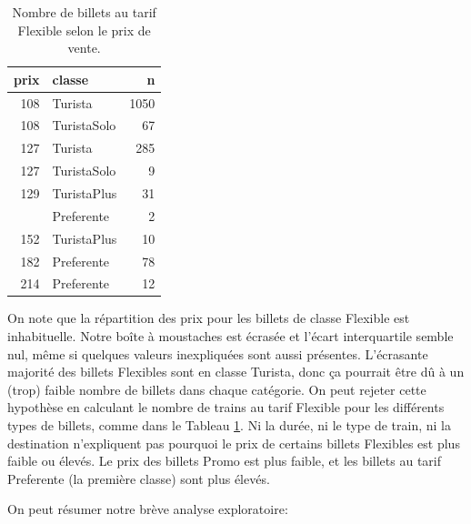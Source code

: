 \documentclass[
  11pt,
  letterpaper,
]{book}
\theoremstyle{definition}
\theoremstyle{definition}
\theoremstyle{definition}
\theoremstyle{definition}
\theoremstyle{remark}
\begin{document}
\begin{table}

\caption{\label{tab:renfeaedrep}Nombre de billets au tarif Flexible selon le prix de vente.}
\centering
\begin{tabular}[t]{rlr}
\toprule
prix & classe & n\\
\midrule
108 & Turista & 1050\\
108 & TuristaSolo & 67\\
127 & Turista & 285\\
127 & TuristaSolo & 9\\
129 & TuristaPlus & 31\\
\addlinespace
140 & Preferente & 2\\
152 & TuristaPlus & 10\\
182 & Preferente & 78\\
214 & Preferente & 12\\
\bottomrule
\end{tabular}
\end{table}

On note que la répartition des prix pour les billets de classe Flexible est inhabituelle. Notre boîte à moustaches est écrasée et l'écart interquartile semble nul, même si quelques valeurs inexpliquées sont aussi présentes. L'écrasante majorité des billets Flexibles sont en classe Turista, donc ça pourrait être dû à un (trop) faible nombre de billets dans chaque catégorie. On peut rejeter cette hypothèse en calculant le nombre de trains au tarif Flexible pour les différents types de billets, comme dans le Tableau \ref{tab:renfeaedrep}. Ni la durée, ni le type de train, ni la destination n'expliquent pas pourquoi le prix de certains billets Flexibles est plus faible ou élevés. Le prix des billets Promo est plus faible, et les billets au tarif Preferente (la première classe) sont plus élevés.

On peut résumer notre brève analyse exploratoire:
\end{document}
